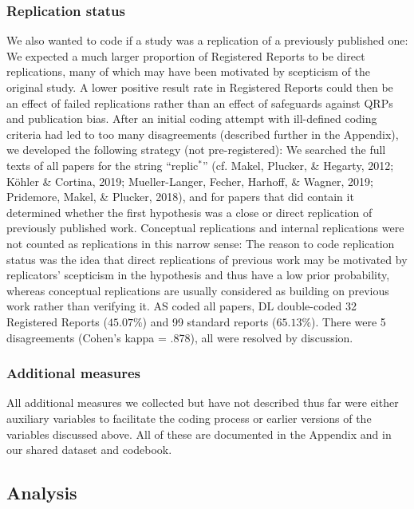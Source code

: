 \documentclass[british,,jou,floatsintext]{apa6}
\begin{document}
\hypertarget{replication-status}{%
\subsubsection{Replication status}\label{replication-status}}

We also wanted to code if a study was a replication of a previously published one:
We expected a much larger proportion of Registered Reports to be direct replications, many of which may have been motivated by scepticism of the original study.
A lower positive result rate in Registered Reports could then be an effect of failed replications rather than an effect of safeguards against QRPs and publication bias.
After an initial coding attempt with ill-defined coding criteria had led to too many disagreements (described further in the Appendix), we developed the following strategy (not pre-registered):
We searched the full texts of all papers for the string \enquote{replic\(^\ast\)} (cf. Makel, Plucker, \& Hegarty, 2012; Köhler \& Cortina, 2019; Mueller-Langer, Fecher, Harhoff, \& Wagner, 2019; Pridemore, Makel, \& Plucker, 2018), and for papers that did contain it determined whether the first hypothesis was a close or direct replication of previously published work.
Conceptual replications and internal replications were not counted as replications in this narrow sense:
The reason to code replication status was the idea that direct replications of previous work may be motivated by replicators' scepticism in the hypothesis and thus have a low prior probability, whereas conceptual replications are usually considered as building on previous work rather than verifying it.
AS coded all papers, DL double-coded 32 Registered Reports (\(45.07 \%\)) and 99 standard reports (\(65.13 \%\)).
There were 5 disagreements (Cohen's kappa = .878), all were resolved by discussion.

\hypertarget{additional-measures}{%
\subsubsection{Additional measures}\label{additional-measures}}

All additional measures we collected but have not described thus far were either auxiliary variables to facilitate the coding process or earlier versions of the variables discussed above.
All of these are documented in the Appendix and in our shared dataset and codebook.

\hypertarget{analysis}{%
\subsection{Analysis}\label{analysis}}
\end{document}
